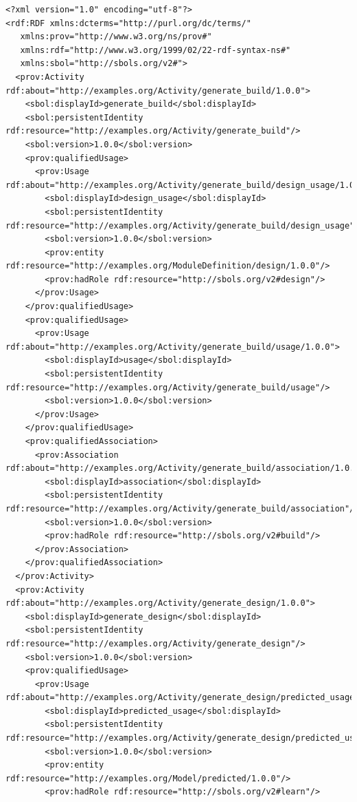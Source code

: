 \begin{lstlisting}
<?xml version="1.0" encoding="utf-8"?>
<rdf:RDF xmlns:dcterms="http://purl.org/dc/terms/"
   xmlns:prov="http://www.w3.org/ns/prov#"
   xmlns:rdf="http://www.w3.org/1999/02/22-rdf-syntax-ns#"
   xmlns:sbol="http://sbols.org/v2#">
  <prov:Activity rdf:about="http://examples.org/Activity/generate_build/1.0.0">
    <sbol:displayId>generate_build</sbol:displayId>
    <sbol:persistentIdentity rdf:resource="http://examples.org/Activity/generate_build"/>
    <sbol:version>1.0.0</sbol:version>
    <prov:qualifiedUsage>
      <prov:Usage rdf:about="http://examples.org/Activity/generate_build/design_usage/1.0.0">
        <sbol:displayId>design_usage</sbol:displayId>
        <sbol:persistentIdentity rdf:resource="http://examples.org/Activity/generate_build/design_usage"/>
        <sbol:version>1.0.0</sbol:version>
        <prov:entity rdf:resource="http://examples.org/ModuleDefinition/design/1.0.0"/>
        <prov:hadRole rdf:resource="http://sbols.org/v2#design"/>
      </prov:Usage>
    </prov:qualifiedUsage>
    <prov:qualifiedUsage>
      <prov:Usage rdf:about="http://examples.org/Activity/generate_build/usage/1.0.0">
        <sbol:displayId>usage</sbol:displayId>
        <sbol:persistentIdentity rdf:resource="http://examples.org/Activity/generate_build/usage"/>
        <sbol:version>1.0.0</sbol:version>
      </prov:Usage>
    </prov:qualifiedUsage>
    <prov:qualifiedAssociation>
      <prov:Association rdf:about="http://examples.org/Activity/generate_build/association/1.0.0">
        <sbol:displayId>association</sbol:displayId>
        <sbol:persistentIdentity rdf:resource="http://examples.org/Activity/generate_build/association"/>
        <sbol:version>1.0.0</sbol:version>
        <prov:hadRole rdf:resource="http://sbols.org/v2#build"/>
      </prov:Association>
    </prov:qualifiedAssociation>
  </prov:Activity>
  <prov:Activity rdf:about="http://examples.org/Activity/generate_design/1.0.0">
    <sbol:displayId>generate_design</sbol:displayId>
    <sbol:persistentIdentity rdf:resource="http://examples.org/Activity/generate_design"/>
    <sbol:version>1.0.0</sbol:version>
    <prov:qualifiedUsage>
      <prov:Usage rdf:about="http://examples.org/Activity/generate_design/predicted_usage/1.0.0">
        <sbol:displayId>predicted_usage</sbol:displayId>
        <sbol:persistentIdentity rdf:resource="http://examples.org/Activity/generate_design/predicted_usage"/>
        <sbol:version>1.0.0</sbol:version>
        <prov:entity rdf:resource="http://examples.org/Model/predicted/1.0.0"/>
        <prov:hadRole rdf:resource="http://sbols.org/v2#learn"/>

\end{lstlisting}
